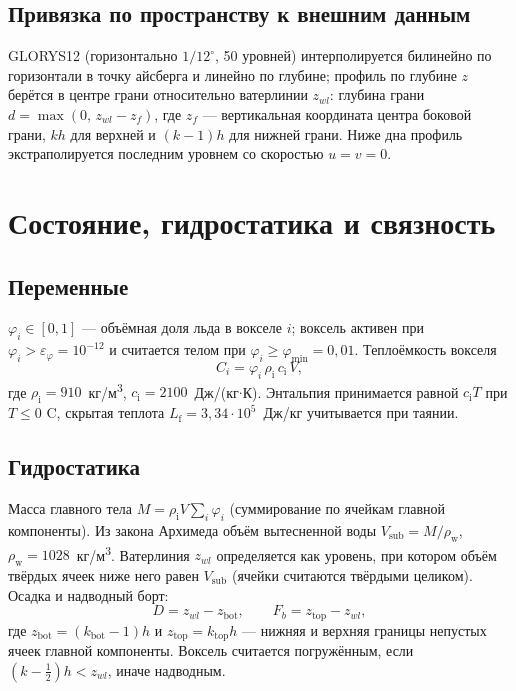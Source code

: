 \documentclass[12pt,a4paper]{article}
\newcommand{\Lf}{L_{\mathrm f}}
\newcommand{\rhoi}{\rho_{\mathrm i}}
\newcommand{\rhow}{\rho_{\mathrm w}}
\newcommand{\ci}{c_{\mathrm i}}
\begin{document}
\subsection{Привязка по пространству к внешним данным}
GLORYS12 (горизонтально $1/12^\circ$, 50 уровней) интерполируется билинейно по горизонтали в точку айсберга и линейно по глубине; профиль по глубине $z$ берётся в центре грани относительно ватерлинии $z_{wl}$: глубина грани $d=\max(0,\,z_{wl}-z_f)$, где $z_f$ --- вертикальная координата центра боковой грани, $k h$ для верхней и $(k-1)h$ для нижней грани. Ниже дна профиль экстраполируется последним уровнем со скоростью $u=v=0$.

\section{Состояние, гидростатика и связность}\label{sec:hydro}

\subsection{Переменные}
$\varphi_i\in[0,1]$ --- объёмная доля льда в вокселе $i$; воксель активен при $\varphi_i>\varepsilon_\varphi=10^{-12}$ и считается телом при $\varphi_i\ge\varphi_{\min}=0{,}01$. Теплоёмкость вокселя
\begin{equation}
C_i=\varphi_i\,\rhoi\,\ci\,V,
\end{equation}
где $\rhoi=910$~кг/м\textsuperscript3, $\ci=2100$~Дж/(кг$\cdot$К). Энтальпия принимается равной $\ci T$ при $T\le0$ \textdegree C, скрытая теплота $\Lf=3{,}34\cdot10^5$~Дж/кг учитывается при таянии.

\subsection{Гидростатика}
Масса главного тела $M=\rhoi V\sum_i\varphi_i$ (суммирование по ячейкам главной компоненты). Из закона Архимеда объём вытесненной воды $V_{\mathrm{sub}}=M/\rhow$, $\rhow=1028$~кг/м\textsuperscript3. Ватерлиния $z_{wl}$ определяется как уровень, при котором объём твёрдых ячеек ниже него равен $V_{\mathrm{sub}}$ (ячейки считаются твёрдыми целиком). Осадка и надводный борт:
\begin{equation}
D=z_{wl}-z_{\mathrm{bot}},\qquad F_b=z_{\mathrm{top}}-z_{wl},
\end{equation}
где $z_{\mathrm{bot}}=(k_{\mathrm{bot}}-1)h$ и $z_{\mathrm{top}}=k_{\mathrm{top}}h$ --- нижняя и верхняя границы непустых ячеек главной компоненты. Воксель считается погружённым, если $(k-\tfrac12)h<z_{wl}$, иначе надводным.
\end{document}
